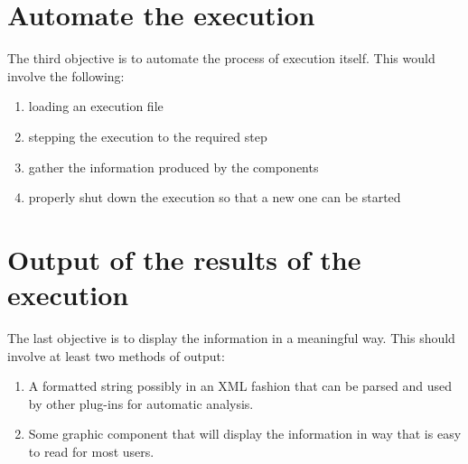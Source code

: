\section{Automate the execution}
\label{section:AutoTaskExecution}
The third objective is to automate the process of execution itself. This would
involve the following:
\begin{enumerate}
  \item loading an execution file
  \item stepping the execution to the required step
  \item gather the information produced by the components
  \item properly shut down the execution so that a new one can be started
\end{enumerate}


\section{Output of the results of the execution}
\label{section:AutoTaskOutput}
The last objective is to display the information in a meaningful way.
This should involve at least two methods of output:
\begin{enumerate}
  \item A formatted string possibly in an XML fashion that can be parsed and
  used by other plug-ins for automatic analysis.
  \item Some graphic component that will display the information in way that is
  easy to read for most users.
\end{enumerate}

